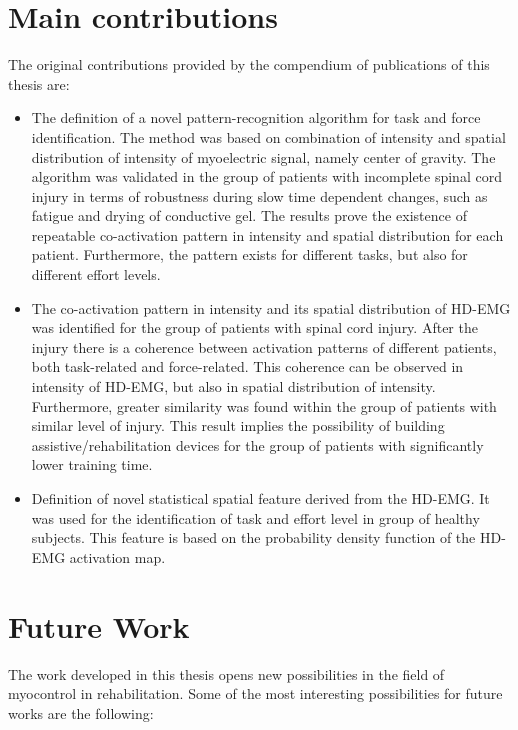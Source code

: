 \section{Main contributions}

The original contributions provided by the compendium of publications of this thesis are:

\begin{itemize}
\item The definition of a novel pattern-recognition algorithm for task and force identification. The method was based on combination of intensity and spatial distribution of intensity of myoelectric signal, namely center of gravity. The algorithm was validated in the group of patients with incomplete spinal cord injury in terms of robustness during slow time dependent changes, such as fatigue and drying of conductive gel. The results prove the existence of repeatable co-activation pattern in intensity and spatial distribution for each patient. Furthermore, the pattern exists for different tasks, but also for different effort levels.

\item The co-activation pattern in intensity and its spatial distribution of HD-EMG was identified for the group of patients with spinal cord injury. After the injury there is a coherence between activation patterns of different patients, both task-related and force-related. This coherence can be observed in intensity of HD-EMG, but also in spatial distribution of intensity. Furthermore, greater similarity was found within the group of patients with similar level of injury. This result implies the possibility of building assistive/rehabilitation devices for the group of patients with significantly lower training time.

\item Definition of novel statistical spatial feature derived from the HD-EMG. It was used for the identification of task and effort level in group of healthy subjects. This feature is based on the probability density function of the HD-EMG activation map. 


\end{itemize}

\section{Future Work}
\label{sec:fw}
The work developed in this thesis opens new possibilities in the field of myocontrol in rehabilitation. Some of the most interesting possibilities for future works are the following: 

